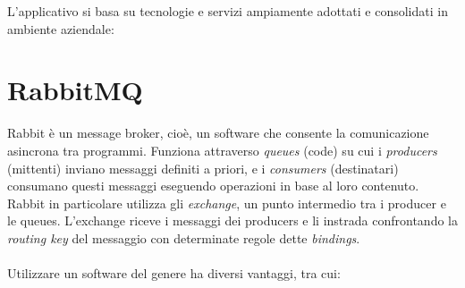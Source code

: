 L'applicativo si basa su tecnologie e servizi ampiamente adottati e consolidati in ambiente aziendale:

\section{RabbitMQ}
%
Rabbit \`e un message broker, cio\`e, un software che consente la comunicazione asincrona tra programmi.
Funziona attraverso \textit{queues} (code) su cui i \textit{producers} (mittenti) inviano messaggi definiti a priori,
e i \textit{consumers} (destinatari) consumano questi messaggi eseguendo operazioni in base al loro contenuto.
Rabbit in particolare utilizza gli \textit{exchange}, un punto intermedio tra i producer e le queues.
L'exchange riceve i messaggi dei producers e li instrada confrontando la \textit{routing key} del messaggio con determinate regole dette \textit{bindings}.\\\\
%
Utilizzare un software del genere ha diversi vantaggi, tra cui:\

